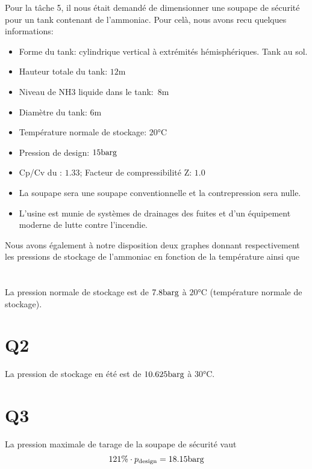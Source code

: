Pour la t\^ache 5, il nous était demandé de dimensionner une soupape de sécurité
pour un tank contenant de l'ammoniac. Pour celà, nous avons recu quelques informations:
\begin{itemize}
\item{Forme du tank: cylindrique vertical à extrémités hémisphériques. Tank au sol.}
\item{Hauteur totale du tank: $12\si{\meter}$}
\item{Niveau de NH3 liquide dans le tank: $8\si{\meter}$}
\item{Diamètre du tank: $6\si{\meter}$}
\item{Température normale de stockage: $20\si{\degreeCelsius}$}
\item{Pression de design: $15 \si{\bar}\text{g}$}
\item{Cp/Cv du : $1.33$; Facteur de compressibilité Z: $1.0$}
\item{La soupape sera une soupape conventionnelle et la contrepression sera nulle.}
\item{L’usine est munie de systèmes de drainages des fuites et d’un équipement moderne de lutte contre l’incendie.}
\end{itemize}
Nous avons également à notre disposition deux graphes donnant respectivement les pressions de stockage
de l'ammoniac en fonction de la température ainsi que 

\section{} La pression normale de stockage est de $7.8 \si{\bar}\text{g}$ à $20\si{\celsius}$ 
(température normale de stockage). 

\section{Q2} La pression de stockage en été est de $10.625 \si{\bar}\text{g}$ à $30\si{\celsius}$.

\section{Q3} La pression maximale de tarage de la soupape de sécurité vaut 
\[ 121\% \cdot p_{\text{design}} = 18.15\si{\bar}\text{g} \]

